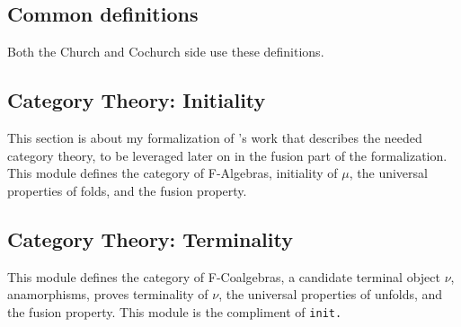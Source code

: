 \subsection{Common definitions}
Both the Church and Cochurch side use these definitions.



\subsection{Category Theory: Initiality}
This section is about my formalization of \cite{Harper2011}'s work that describes the needed category theory, to be leveraged later on in the fusion part of the formalization.
This module defines the category of F-Algebras, initiality of $\mu$, the universal properties of folds, and the fusion property.



\subsection{Category Theory: Terminality}
This module defines the category of F-Coalgebras, a candidate terminal object $\nu$, anamorphisms, proves terminality of $\nu$, the universal properties of unfolds, and the fusion property.
This module is the compliment of \tt{init}.


